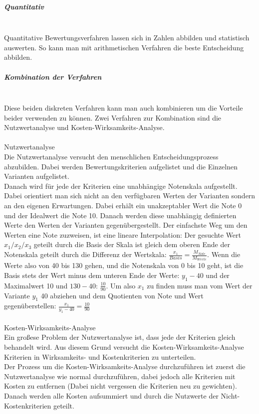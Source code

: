 \documentclass{article}
\newcommand{\subparagraphlb}[1]{\subparagraph{#1}\mbox{}\\}
\begin{document}
	\subparagraphlb{Quantitativ}
	Quantitative Bewertungsverfahren lassen sich in Zahlen abbilden und statistisch auswerten. So kann man mit arithmetischen Verfahren die beste Entscheidung abbilden.
	\subparagraphlb{Kombination der Verfahren}
	Diese beiden diskreten Verfahren kann man auch kombinieren um die Vorteile beider verwenden zu können. Zwei Verfahren zur Kombination sind die Nutzwertanalyse und Kosten-Wirksamkeits-Analyse. \\ \\
	{\textbf \Large Nutzwertanalyse} \\
	Die Nutzwertanalyse versucht den menschlichen Entscheidungsprozess abzubilden. Dabei werden Bewertungskriterien aufgelistet und die Einzelnen Varianten aufgelistet. \\
	Danach wird für jede der Kriterien eine unabhängige Notenskala aufgestellt. Dabei orientiert man sich nicht an den verfügbaren Werten der Varianten sondern an den eigenen Erwartungen. Dabei erhält ein unakzeptabler Wert die Note 0 und der Idealwert die Note 10. Danach werden diese unabhängig definierten Werte den Werten der Varianten gegenübergestellt. Der einfachste Weg um den Werten eine Note zuzweisen, ist eine lineare Interpolation: Der gesuchte Wert $x_1/x_2/x_3$ geteilt durch die Basis der Skala ist gleich dem oberen Ende der Notenskala geteilt durch die Differenz der Wertskala: $\frac{x_1}{Basis}=\frac{M_{Note}}{M_{Werte}}$. Wenn die Werte also von 40 bis 130 gehen, und die Notenskala von 0 bis 10 geht, ist die Basis stets der Wert minus dem unteren Ende der Werte: $y_1-40$ und der Maximalwert 10 und $130-40$: $\frac{10}{90}$. Um also $x_1$ zu finden muss man vom Wert der Variante $y_1$ 40 abziehen und dem Quotienten von Note und Wert gegenüberstellen: $\frac{x_1}{y_1-40}=\frac{10}{90}$ \\ \\
	{\textbf \Large Kosten-Wirksamkeits-Analyse} \\
	Ein großese Problem der Nutzwertanalyse ist, dass jede der Kriterien gleich behandelt wird. Aus diesem Grund versucht die Kosten-Wirksamkeits-Analyse Kriterien in Wirksamkeits- und Kostenkriterien zu unterteilen. \\
	Der Prozess um die Kosten-Wirksamkeits-Analyse durchzuführen ist zuerst die Nutzwertanalyse wie normal durchzuführen, dabei jedoch alle Kriterien mit Kosten zu entfernen (Dabei nicht vergessen die Kriterien neu zu gewichten). Danach werden alle Kosten aufsummiert und durch die Nutzwerte der Nicht-Kostenkriterien geteilt.
\end{document}
